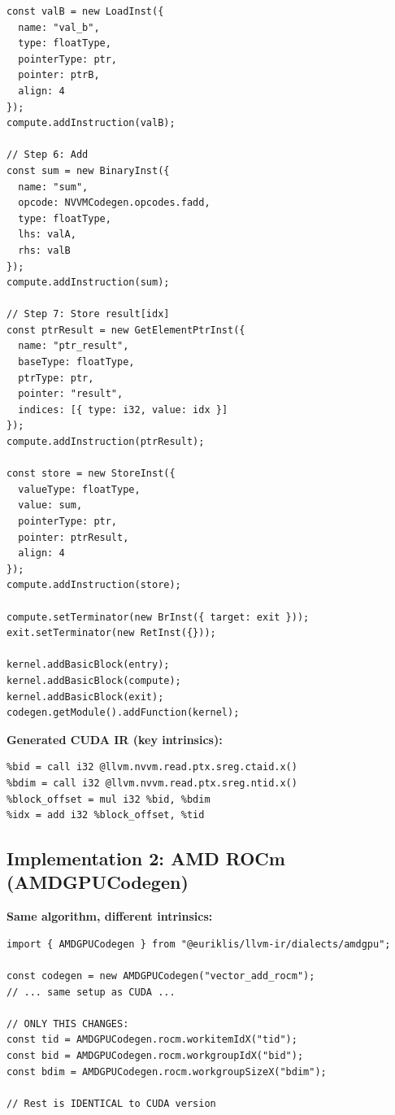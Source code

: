 \documentclass[11pt]{article}
\begin{document}
\begin{lstlisting}[style=ts]
const valB = new LoadInst({
  name: "val_b",
  type: floatType,
  pointerType: ptr,
  pointer: ptrB,
  align: 4
});
compute.addInstruction(valB);

// Step 6: Add
const sum = new BinaryInst({
  name: "sum",
  opcode: NVVMCodegen.opcodes.fadd,
  type: floatType,
  lhs: valA,
  rhs: valB
});
compute.addInstruction(sum);

// Step 7: Store result[idx]
const ptrResult = new GetElementPtrInst({
  name: "ptr_result",
  baseType: floatType,
  ptrType: ptr,
  pointer: "result",
  indices: [{ type: i32, value: idx }]
});
compute.addInstruction(ptrResult);

const store = new StoreInst({
  valueType: floatType,
  value: sum,
  pointerType: ptr,
  pointer: ptrResult,
  align: 4
});
compute.addInstruction(store);

compute.setTerminator(new BrInst({ target: exit }));
exit.setTerminator(new RetInst({}));

kernel.addBasicBlock(entry);
kernel.addBasicBlock(compute);
kernel.addBasicBlock(exit);
codegen.getModule().addFunction(kernel);
\end{lstlisting}

\textbf{Generated CUDA IR (key intrinsics):}
\begin{lstlisting}[style=ir]
%tid = call i32 @llvm.nvvm.read.ptx.sreg.tid.x()
%bid = call i32 @llvm.nvvm.read.ptx.sreg.ctaid.x()
%bdim = call i32 @llvm.nvvm.read.ptx.sreg.ntid.x()
%block_offset = mul i32 %bid, %bdim
%idx = add i32 %block_offset, %tid
\end{lstlisting}

\subsection{Implementation 2: AMD ROCm (AMDGPUCodegen)}

\textbf{Same algorithm, different intrinsics:}

\begin{lstlisting}[style=ts]
import { AMDGPUCodegen } from "@euriklis/llvm-ir/dialects/amdgpu";

const codegen = new AMDGPUCodegen("vector_add_rocm");
// ... same setup as CUDA ...

// ONLY THIS CHANGES:
const tid = AMDGPUCodegen.rocm.workitemIdX("tid");
const bid = AMDGPUCodegen.rocm.workgroupIdX("bid");
const bdim = AMDGPUCodegen.rocm.workgroupSizeX("bdim");

// Rest is IDENTICAL to CUDA version
\end{lstlisting}
\end{document}
